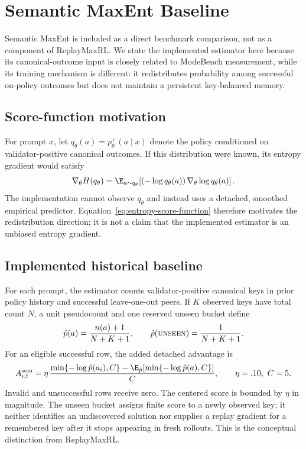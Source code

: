 \section{Semantic MaxEnt Baseline}
\label{app:semantic-maxent}

Semantic MaxEnt is included as a direct benchmark comparison, not as a
component of ReplayMaxRL. We state the implemented estimator here because its
canonical-outcome input is closely related to ModeBench measurement, while its
training mechanism is different: it redistributes probability among successful
on-policy outcomes but does not maintain a persistent key-balanced memory.

\subsection{Score-function motivation}
\label{app:semantic-score}

For prompt $x$, let $q_\theta(a)=p_\theta^+(a\mid x)$ denote the policy
conditioned on validator-positive canonical outcomes. If this distribution
were known, its entropy gradient would satisfy
\begin{equation}
  \nabla_\theta H(q_\theta)
  =\E_{a\sim q_\theta}\!\left[
    (-\log q_\theta(a))\,\nabla_\theta\log q_\theta(a)
  \right].
  \label{eq:entropy-score-function}
\end{equation}
The implementation cannot observe $q_\theta$ and instead uses a detached,
smoothed empirical predictor. Equation~\ref{eq:entropy-score-function}
therefore motivates the redistribution direction; it is not a claim that the
implemented estimator is an unbiased entropy gradient.

\subsection{Implemented historical baseline}
\label{app:legacy-semantic-estimator}
\label{app:semantic-estimator}

For each prompt, the estimator counts validator-positive canonical keys in
prior policy history and successful leave-one-out peers. If $K$ observed keys
have total count $N$, a unit pseudocount and one reserved unseen bucket define
\begin{equation}
  \hat p(a)=\frac{n(a)+1}{N+K+1},\qquad
  \hat p(\textsc{unseen})=\frac{1}{N+K+1}.
  \label{eq:open-set-predictor}
\end{equation}
For an eligible successful row, the added detached advantage is
\begin{equation}
  A^{\mathrm{sem}}_{i,t}
  =\eta\,\frac{\min\{-\log\hat p(a_i),C\}
    -\E_{\hat p}[\min\{-\log\hat p(a),C\}]}{C},
  \qquad \eta=.10,\ C=5.
  \label{eq:legacy-semantic-advantage}
\end{equation}
Invalid and unsuccessful rows receive zero. The centered score is bounded by
$\eta$ in magnitude. The unseen bucket assigns finite score to a newly observed
key; it neither identifies an undiscovered solution nor supplies a replay
gradient for a remembered key after it stops appearing in fresh rollouts. This is the conceptual distinction from
ReplayMaxRL.

